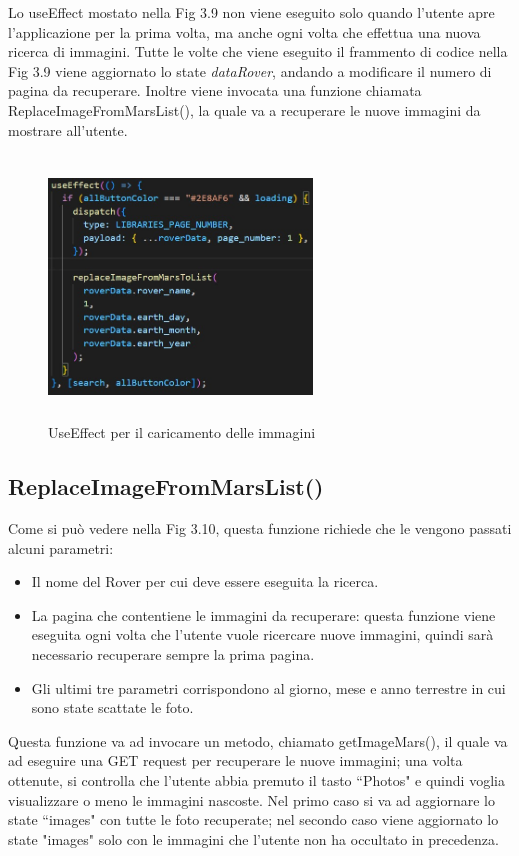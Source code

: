 Lo useEffect mostato nella Fig 3.9 non viene eseguito solo quando l'utente apre l'applicazione per la prima volta, ma anche ogni volta che effettua una nuova ricerca di immagini.
Tutte le volte che viene eseguito il frammento di codice nella Fig 3.9 viene aggiornato lo state \textit{dataRover}, andando a modificare il numero di pagina da recuperare. Inoltre viene invocata una funzione chiamata ReplaceImageFromMarsList{}(),
la quale va a recuperare le nuove immagini da mostrare all'utente.
\begin{figure}[h]
    \centering
    \includegraphics[width=7cm, height=7cm]{images/useEffect.jpg}
    \caption[differenzeiteot]{UseEffect per il caricamento delle immagini}
    \label{fig:useEffect}
\end{figure}
\subsection*{ReplaceImageFromMarsList()}
Come si pu\`o vedere nella Fig 3.10, questa funzione richiede che le vengono passati alcuni parametri:
\begin{itemize}
    \item Il nome del Rover per cui deve essere eseguita la ricerca.
    \item La pagina che contentiene le immagini da recuperare: questa funzione viene eseguita ogni volta che l'utente vuole ricercare nuove immagini, quindi sar\`a necessario recuperare sempre la prima pagina.
    \item Gli ultimi tre parametri corrispondono al giorno, mese e anno terrestre in cui sono state scattate le foto.
\end{itemize}

Questa funzione va ad invocare un metodo, chiamato getImageMars(), il quale va ad eseguire una GET request per recuperare le nuove immagini; una volta ottenute, si controlla che l'utente abbia premuto il tasto ``Photos" e quindi voglia visualizzare o meno le immagini nascoste.
Nel primo caso si va ad aggiornare lo state ``images" con tutte le foto recuperate; nel secondo caso viene aggiornato lo state "images" solo con le immagini che l'utente non ha occultato in precedenza.

